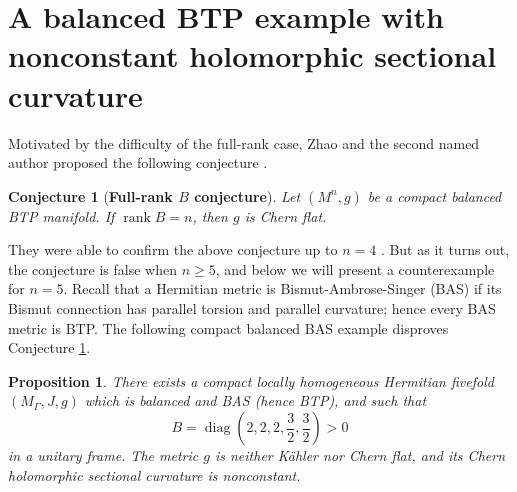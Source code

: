 \documentclass{amsart}
\newtheorem{proposition}{Proposition}
\newtheorem{conjecture}{Conjecture}
\newcommand{\revnote}[1]{\par\Needspace{10\baselineskip}\smallskip\noindent
  {\color{orange}\textbf{Revision note.} #1}\par\nopagebreak[4]\smallskip}
\begin{document}
\section{A balanced BTP example with nonconstant holomorphic sectional curvature} \label{sec:full-rank-example}
{Motivated by the difficulty of the full-rank case, Zhao and the second
named author proposed the following conjecture \cite{ZhaoZprivate}.
}

\begin{conjecture}[{\bf Full-rank $B$ conjecture}]\label{conj2}
{Let $(M^n,g)$ be a compact balanced BTP manifold. If
$\operatorname{rank}B=n$, then $g$ is Chern flat.
}\end{conjecture}

{They were able to confirm the above conjecture up to $n=4$ \cite{ZhaoZprivate}. But as it turns out, the conjecture is false when $n\geq 5$, and below we will present a counterexample for $n=5$.  Recall that a Hermitian metric is Bismut-Ambrose-Singer (BAS) if its Bismut connection has parallel torsion and parallel curvature; hence every BAS metric is BTP. The following compact balanced BAS example disproves Conjecture
\ref{conj2}.
}

\begin{proposition}\label{prop:full-rank-example}
{There exists a compact locally homogeneous Hermitian fivefold
$(M_\Gamma,J,g)$ which is balanced and BAS (hence BTP), and such that
}\[
 {B=\operatorname{diag}\left(2,2,2,\frac{3}{2},\frac{3}{2}\right)>0
}\]
{in a unitary frame. The metric $g$ is neither K\"ahler nor Chern flat,
and its Chern holomorphic sectional curvature is nonconstant.
}\end{proposition}
\end{document}
